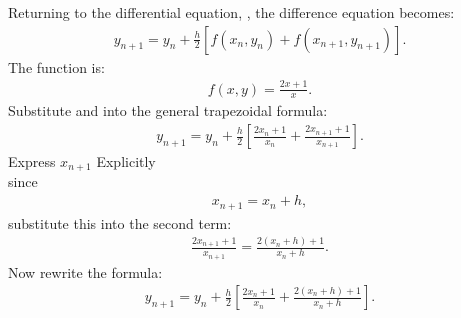 \documentclass[journal]{IEEEtran}
\begin{document}
Returning to the differential equation, , the difference equation becomes:
\begin{align}
y_{n+1} = y_n + \frac{h}{2} \left[ f(x_n, y_n) + f(x_{n+1}, y_{n+1}) \right].
\end{align}
The function  is:
\begin{align}
f(x, y) = \frac{2x + 1}{x}.
\end{align}
Substitute  and  into the general trapezoidal formula:
\begin{align}
y_{n+1} = y_n + \frac{h}{2} \left[ \frac{2x_n + 1}{x_n} + \frac{2x_{n+1} + 1}{x_{n+1}} \right].
\end{align}
 Express $x_{n+1}$ Explicitly \\
 since 
 \begin{align}
     x_{n+1} = x_n + h,
 \end{align}
 substitute this into the second term: 
 \begin{align}
     \frac{2x_{n+1} + 1}{x_{n+1}} = \frac{2(x_n + h) + 1}{x_n + h}.
 \end{align}
 Now rewrite the formula:
 \begin{align}
     y_{n+1} = y_n + \frac{h}{2} \left[ \frac{2x_n + 1}{x_n} + \frac{2(x_n + h) + 1}{x_n + h} \right].
 \end{align}
\end{document}
